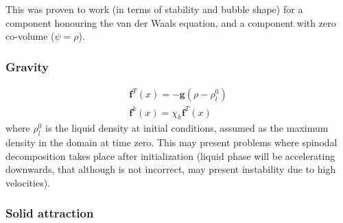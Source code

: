 \documentclass{article}
\begin{document}
		This was proven to work (in terms of stability and bubble shape) for a component honouring the van der Waals equation, and a component with zero co-volume ($\psi = \rho$). 
		
		\subsubsection{Gravity}
		
		\begin{equation}
		\begin{split}
		\mathbf{f}^{T} (x) = -\mathbf{g} (\rho - \rho^0_l) \\
		\mathbf{f}^{k} (x) = \chi_{k} \mathbf{f}^{T} (x)
		\end{split}
		\end{equation}
		where $\rho^0_l$ is the liquid density at initial conditions, assumed as the maximum density in the domain at time zero. This may present problems where spinodal decomposition takes place after initialization (liquid phase will be accelerating downwards, that although is not incorrect, may present instability due to high velocities).
		\subsubsection{Solid attraction}
		
\end{document}
